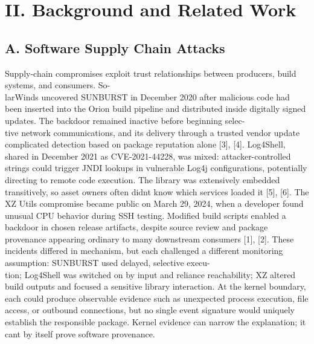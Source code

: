 \documentclass[conference]{IEEEtran}
\begin{document}
\section*{II. Background and Related Work}
\subsection*{A. Software Supply Chain Attacks}
Supply-chain compromises exploit trust relationships between producers, build systems, and consumers. So-\\larWinds uncovered SUNBURST in December 2020 after malicious code had been inserted into the Orion build pipeline and distributed inside digitally signed updates. The backdoor remained inactive before beginning selec-\\tive network communications, and its delivery through a trusted vendor update complicated detection based on package reputation alone {[}3{]}, {[}4{]}. Log4Shell, shared in December 2021 as CVE-2021-44228, was mixed: attacker-controlled strings could trigger JNDI lookups in vulnerable Log4j configurations, potentially directing to remote code execution. The library was extensively embedded transitively, so asset owners often didn\textquotesingle t know which services loaded it {[}5{]}, {[}6{]}. The XZ Utils compromise became public on March 29, 2024, when a developer found unusual CPU behavior during SSH testing. Modified build scripts enabled a backdoor in chosen release artifacts, despite source review and package provenance appearing ordinary to many downstream consumers {[}1{]}, {[}2{]}. These incidents differed in mechanism, but each challenged a different monitoring assumption: SUNBURST used delayed, selective execu-\\tion; Log4Shell was switched on by input and reliance reachability; XZ altered build outputs and focused a sensitive library interaction. At the kernel boundary, each could produce observable evidence such as unexpected process execution, file access, or outbound connections, but no single event signature would uniquely establish the responsible package. Kernel evidence can narrow the explanation; it can\textquotesingle t by itself prove software provenance.
\end{document}

